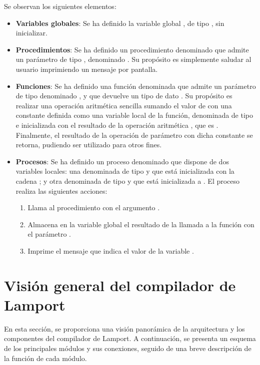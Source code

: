\noindent
Se observan los siguientes elementos:
\begin{itemize}
    \item \textbf{Variables globales}: Se ha definido la variable global , de tipo , sin inicializar.
    \item \textbf{Procedimientos}: Se ha definido un procedimiento denominado  que admite un parámetro de tipo , denominado . Su propósito es simplemente saludar al usuario imprimiendo un mensaje por pantalla.
    \item \textbf{Funciones}: Se ha definido una función denominada  que admite un parámetro de tipo  denominado , y que devuelve un tipo de dato . Su propósito es realizar una operación aritmética sencilla sumando el valor de  con una constante definida como una variable local de la función, denominada  de tipo  e inicializada con el resultado de la operación aritmética , que es . Finalmente, el resultado de la operación de parámetro con dicha constante se retorna, pudiendo ser utilizado para otros fines.
    \item \textbf{Procesos}: Se ha definido un proceso denominado  que dispone de dos variables locales: una denominada  de tipo  y que está inicializada con la cadena ; y otra denominada  de tipo  y que está inicializada a . El proceso realiza las siguientes acciones:
    \begin{enumerate}
        \item Llama al procedimiento  con el argumento .
        \item Almacena en la variable global  el resultado de la llamada a la función  con el parámetro .
        \item Imprime el mensaje que indica el valor de la variable .
    \end{enumerate}
\end{itemize}

\section{Visión general del compilador de Lamport}
En esta sección, se proporciona una visión panorámica de la arquitectura y los componentes del compilador de Lamport. A continuación, se presenta un esquema de los principales módulos y sus conexiones, seguido de una breve descripción de la función de cada módulo.

